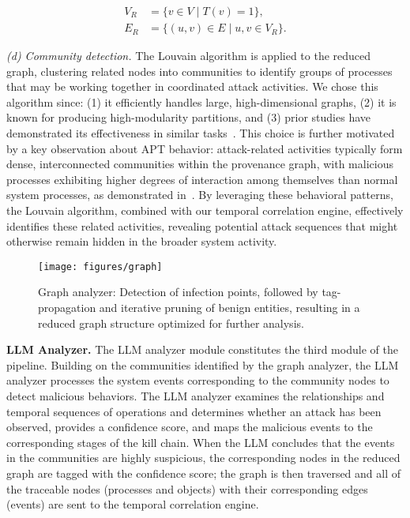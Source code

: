 \begin{equation}
\begin{aligned}
V_R &= \{ v \in V \mid T(v) = 1\}, \\
E_R &= \{ (u, v) \in E \mid u, v \in V_R \}.
\end{aligned}
\end{equation}

\noindent\textit{(d) Community detection.} The Louvain algorithm is applied to the reduced graph, clustering related nodes into communities to identify groups of processes that may be working together in coordinated attack activities. We chose this algorithm since: (1) it efficiently handles large, high-dimensional graphs, (2) it is known for producing high-modularity partitions, and (3) prior studies have demonstrated its effectiveness in similar tasks~\cite{pei2016hercule}. 
This choice is further motivated by a key observation about APT behavior: attack-related activities typically form dense, interconnected communities within the provenance graph, with malicious processes exhibiting higher degrees of interaction among themselves than normal system processes, as demonstrated in~\cite{blondel2008fast}. 
By leveraging these behavioral patterns, the Louvain algorithm, combined with our temporal correlation engine, effectively identifies these related activities, revealing potential attack sequences that might otherwise remain hidden in the broader system activity.

\begin{figure}[ht]
\setlength{\abovecaptionskip}{3pt}
\setlength{\belowcaptionskip}{0pt}
\centering
\texttt{[image: figures/graph]}
\caption{Graph analyzer: Detection of infection points, followed by tag-propagation and iterative pruning of benign entities, resulting in a reduced graph structure optimized for further analysis.}
\label{fig:graph_analyzer}
\end{figure}

\noindent\textbf{LLM Analyzer.}
The LLM analyzer module constitutes the third module of the \method pipeline. 
Building on the communities identified by the graph analyzer, the LLM analyzer processes the system events corresponding to the community nodes to detect malicious behaviors. 
The LLM analyzer examines the relationships and temporal sequences of operations and determines whether an attack has been observed, provides a confidence score, and maps the malicious events to the corresponding stages of the kill chain. 
When the LLM concludes that the events in the communities are highly suspicious, the corresponding nodes in the reduced graph are tagged with the confidence score; the graph is then traversed and all of the traceable nodes (processes and objects) with their corresponding edges (events) are sent to the temporal correlation engine. 

